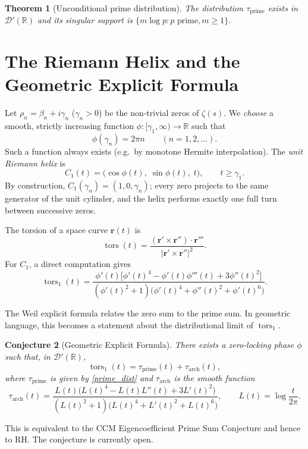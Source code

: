 \documentclass[12pt,a4paper,twoside]{book}
\newtheorem{theorem}{Theorem}[chapter]
\newtheorem{conjecture}[theorem]{Conjecture}
\newcommand{\R}{\mathbb{R}}
\newcommand{\dist}{\mathcal{D}'}
\newcommand{\tors}{\operatorname{tors}}
\begin{document}
\begin{theorem}[Unconditional prime distribution]
The distribution \(\tau_{\text{prime}}\) exists in \(\dist(\R)\) and its singular support is \(\{m\log p : p\text{ prime}, m\ge1\}\).
\end{theorem}

\section{The Riemann Helix and the Geometric Explicit Formula}

Let \(\rho_n = \beta_n + i\gamma_n\) (\(\gamma_n>0\)) be the non‑trivial zeros of \(\zeta(s)\).  We \emph{choose} a smooth, strictly increasing function \(\phi:[\gamma_1,\infty)\to\R\) such that
\[
\phi(\gamma_n) = 2\pi n \qquad (n=1,2,\dots).
\]
Such a function always exists (e.g.\ by monotone Hermite interpolation).  The \emph{unit Riemann helix} is
\[
C_1(t) = \bigl( \cos\phi(t),\; \sin\phi(t),\; t \bigr), \qquad t \ge \gamma_1 .
\]
By construction, \(C_1(\gamma_n) = (1,0,\gamma_n)\); every zero projects to the same generator of the unit cylinder, and the helix performs exactly one full turn between successive zeros.

The torsion of a space curve \(\mathbf{r}(t)\) is
\[
\tors(t) = \frac{(\mathbf{r}'\times\mathbf{r}'')\cdot\mathbf{r}'''}{|\mathbf{r}'\times\mathbf{r}''|^2}.
\]
For \(C_1\), a direct computation gives
\[
\tors_1(t) = \frac{\phi'(t)\bigl[ \phi'(t)^4 - \phi'(t)\phi'''(t) + 3\phi''(t)^2 \bigr]}
                  {(\phi'(t)^2+1)\bigl( \phi'(t)^4 + \phi''(t)^2 + \phi'(t)^6 \bigr)} . \tag{4}
\]

The Weil explicit formula relates the zero sum to the prime sum.  In geometric language, this becomes a statement about the distributional limit of \(\tors_1\).

\begin{conjecture}[Geometric Explicit Formula]\label{conj:GEF}
There exists a zero‑locking phase \(\phi\) such that, in \(\dist(\R)\),
\[
\tors_1(t) = \tau_{\text{prime}}(t) + \tau_{\text{arch}}(t),
\]
where \(\tau_{\text{prime}}\) is given by \eqref{prime_dist} and \(\tau_{\text{arch}}\) is the smooth function
\[
\tau_{\text{arch}}(t) = \frac{L(t)\bigl(L(t)^4 - L(t)L''(t) + 3L'(t)^2\bigr)}
                            {(L(t)^2+1)\bigl(L(t)^4 + L'(t)^2 + L(t)^6\bigr)},
\qquad L(t)=\log\frac{t}{2\pi}.
\]
\end{conjecture}

This is equivalent to the CCM Eigencoefficient Prime Sum Conjecture and hence to RH.  The conjecture is currently open.
\end{document}
